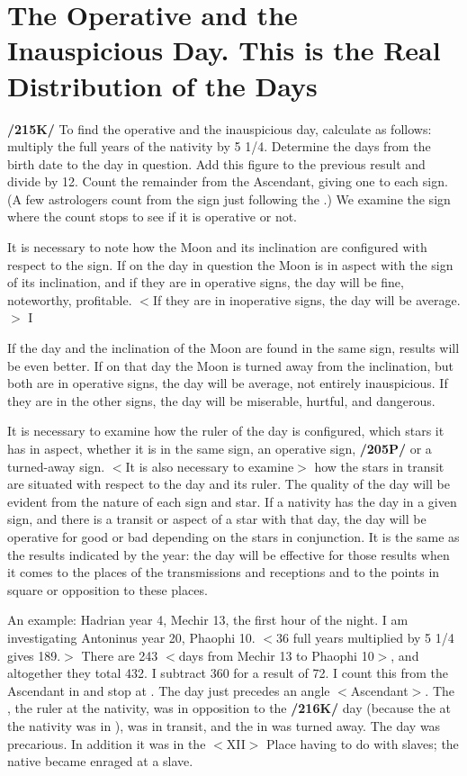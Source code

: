 \section{The Operative and the Inauspicious Day. This is the Real Distribution of the Days}

\textbf{/215K/} To find the operative and the inauspicious day, calculate as follows: multiply the full years of the nativity by 5 1/4. Determine the days from the birth date to the day in question. Add this figure to the previous result and divide by 12. Count the remainder from the Ascendant, giving one to each sign. (A few astrologers count from the sign just following the \Moon.) We examine the sign where the count stops to see if it is operative or not. 

It \mndl  is necessary to note how the Moon and its inclination are configured with respect to the sign. If on the day in question the Moon is in aspect with the sign of its inclination, and if they are in operative signs, the day will be fine, noteworthy, profitable. $<$If they are in inoperative signs, the day will be average.$>$ I

If the day and the inclination of the Moon are found in the same sign, results will be even better. If on that day the Moon is turned away from the inclination, but both are in operative signs, the day will be average, not entirely inauspicious. If they are in the other signs, the day will be miserable, hurtful, and dangerous.

It \mndl is necessary to examine how the ruler of the day is configured, which stars it has in aspect, whether it is in the same sign, an operative sign, \textbf{/205P/} or a turned-away sign. $<$It is also necessary to examine$>$ how the stars in transit are situated with respect to the day and its ruler. The quality of the day will be evident from the nature of each sign and star. If a nativity has the day in a given sign, and there is a transit or aspect of a star with that day, the day will be operative for good or bad depending on the stars in conjunction. It is the same as the results indicated by the year: the day will be effective for those results when it comes to the places of the transmissions and receptions and to the points in square or opposition to these places.

An example: Hadrian year 4, Mechir 13, the first hour of the night. I am investigating Antoninus year 20, Phaophi 10. $<$36 full years multiplied by 5 1/4 gives 189.$>$ There are 243 $<$days from Mechir 13 to
Phaophi 10$>$, and altogether they total 432. I subtract 360 for a result of 72. I count this from the Ascendant in \Virgo\xspace and stop at \Leo. The day just precedes an angle $<$Ascendant$>$. The \Sun, the ruler at the nativity, was in opposition to the \textbf{/216K/} day (because the \Sun\xspace at the nativity was in \Aquarius), \Mars\xspace was in transit, and the \Moon\xspace in \Capricorn\xspace was turned away. The day was precarious. In addition it was in the $<$XII$>$ Place having to do with slaves; the native became enraged at a slave.

